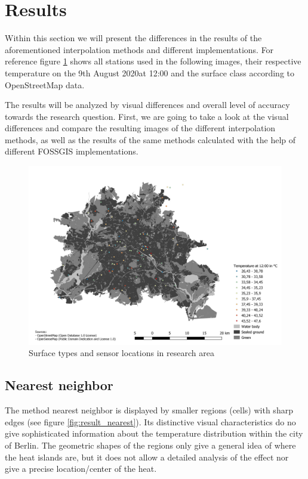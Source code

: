 
\section{Results}

Within this section we will present the differences in the results of the aforementioned interpolation methods and different implementations. For reference figure \ref{fig:result_berlin} shows all stations used in the following images, their respective temperature on the 9th August 2020at 12:00 and the surface class according to OpenStreetMap data.

The results will be analyzed by visual differences and overall level of accuracy towards the research question. First, we are going to take a look at the visual differences and compare the resulting images of the different interpolation methods, as well as the results of the same methods calculated with the help of different FOSSGIS implementations.

\begin{figure}[H]
	\includegraphics[width=\linewidth]{comparison/berlin.png}
	\caption{Surface types and sensor locations in research area}
	\label{fig:result_berlin}
\end{figure}

\subsection{Nearest neighbor}

The method \ldq{}nearest neighbor\rdq{} is displayed by smaller regions (cells) with sharp edges  (see figure \ref{fig:result_nearest}). Its distinctive visual characteristics do no give sophisticated information about the temperature distribution within the city of Berlin. The geometric shapes of the regions only give a general idea of where the heat islands are, but it does not allow a detailed analysis of the effect nor give a precise location/center of the heat.

